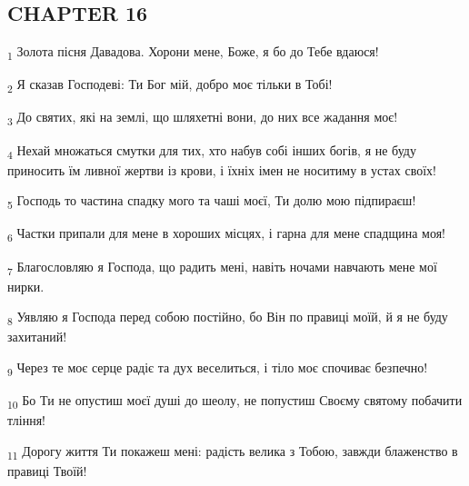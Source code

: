 \subsection{CHAPTER 16}
\begin{tcolorbox}
\textsubscript{1} Золота пісня Давадова. Хорони мене, Боже, я бо до Тебе вдаюся!
\end{tcolorbox}
\begin{tcolorbox}
\textsubscript{2} Я сказав Господеві: Ти Бог мій, добро моє тільки в Тобі!
\end{tcolorbox}
\begin{tcolorbox}
\textsubscript{3} До святих, які на землі, що шляхетні вони, до них все жадання моє!
\end{tcolorbox}
\begin{tcolorbox}
\textsubscript{4} Нехай множаться смутки для тих, хто набув собі інших богів, я не буду приносить їм ливної жертви із крови, і їхніх імен не носитиму в устах своїх!
\end{tcolorbox}
\begin{tcolorbox}
\textsubscript{5} Господь то частина спадку мого та чаші моєї, Ти долю мою підпираєш!
\end{tcolorbox}
\begin{tcolorbox}
\textsubscript{6} Частки припали для мене в хороших місцях, і гарна для мене спадщина моя!
\end{tcolorbox}
\begin{tcolorbox}
\textsubscript{7} Благословляю я Господа, що радить мені, навіть ночами навчають мене мої нирки.
\end{tcolorbox}
\begin{tcolorbox}
\textsubscript{8} Уявляю я Господа перед собою постійно, бо Він по правиці моїй, й я не буду захитаний!
\end{tcolorbox}
\begin{tcolorbox}
\textsubscript{9} Через те моє серце радіє та дух веселиться, і тіло моє спочиває безпечно!
\end{tcolorbox}
\begin{tcolorbox}
\textsubscript{10} Бо Ти не опустиш моєї душі до шеолу, не попустиш Своєму святому побачити тління!
\end{tcolorbox}
\begin{tcolorbox}
\textsubscript{11} Дорогу життя Ти покажеш мені: радість велика з Тобою, завжди блаженство в правиці Твоїй!
\end{tcolorbox}
